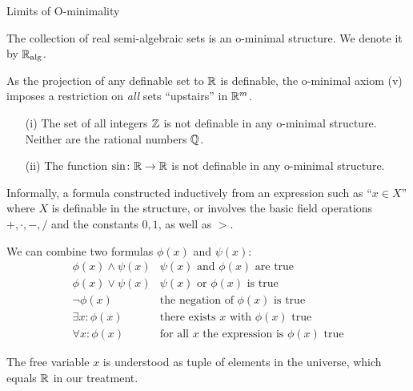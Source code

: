\documentclass{beamer}
\begin{document}
\begin{frame}{Limits of O-minimality}
  \begin{theorem}
    The collection of real semi-algebraic sets is an o-minimal
    structure. We denote it by ${\mathbb{R}}_{\mathrm{alg}}$. 
  \end{theorem}

  As the projection of any definable set to ${\mathbb{R}}$ is definable, the
  o-minimal axiom (v) imposes a restriction on \emph{all} sets
  ``upstairs'' in ${\mathbb{R}}^m$.

  \begin{example}
    \begin{enumerate}
    \item [(i)] The set of all integers ${\mathbb{Z}}$ is \alert{not} definable in any
      o-minimal structure. Neither are the rational numbers ${\mathbb{Q}}$.
    \item[(ii)] The function $\sin \colon{\mathbb{R}}\rightarrow{\mathbb{R}}$ is
      \alert{not} definable in any o-minimal structure. 
    \end{enumerate}
  \end{example}
\end{frame}

\begin{frame}
  Informally, a formula constructed inductively from  an expression
  such as ``$x\in X$'' where $X$ is definable
  in the structure, or involves
  the basic field operations $+,\cdot,-,/$
  and the constants $0,1$, as well as $>$.
  
  We can combine two formulas $\phi(x)$ and $\psi(x)$:
  \begin{equation*}
    \begin{array}{ll}
      \phi(x) \wedge \psi(x) & \text{$\psi(x)$ and $\phi(x)$ are true}\\
     \phi(x) \vee \psi(x) & \text{$\psi(x)$ or $\phi(x)$  is true}\\
     \neg \phi(x)  & \text{the negation of $\phi(x)$ is true}\\
     \exists x: \phi(x) &\text{there exists $x$ with $\phi(x)$ true}\\
     \forall x: \phi(x) &\text{for all $x$ the expression is $\phi(x)$ true}
    \end{array}
  \end{equation*}

  The free variable $x$ is understood as tuple of elements in the
  \alert{universe}, which equals ${\mathbb{R}}$ in our treatment. 
\end{frame}
\end{document}
